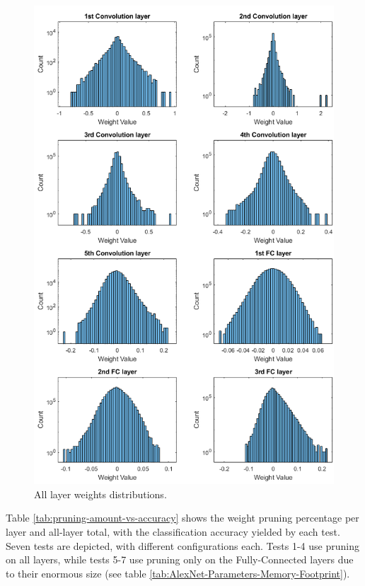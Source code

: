 \begin{figure} [H]
	\centering
	\includegraphics[width=\textwidth]{Images/Weights-distributions/all-layer-original-weights-distributions.png}
	\decoRule
	\caption[All layer weights distributions]{All layer weights distributions.}
	\label{fig:all-layer-original-weights-distributions}
\end{figure}

Table \ref{tab:pruning-amount-vs-accuracy} shows the weight pruning percentage per layer and all-layer total, with the classification accuracy yielded by each test. Seven tests are depicted, with different configurations each. Tests 1-4 use pruning on all layers, while tests 5-7 use pruning only on the Fully-Connected layers due to their enormous size (see table \ref{tab:AlexNet-Parameters-Memory-Footprint}).

